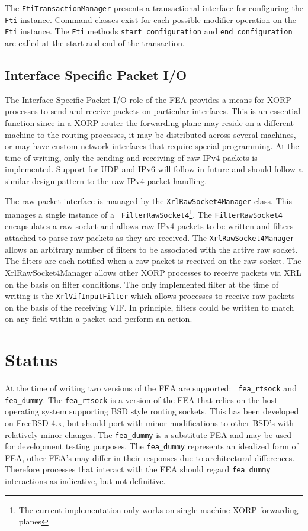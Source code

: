 \documentclass[11pt]{article}
\begin{document}
The {\tt FtiTransactionManager} presents a transactional interface for
configuring the {\tt Fti} instance.  Command classes exist for each
possible modifier operation on the {\tt Fti} instance.  The {\tt Fti}
methods {\tt start\_configuration} and {\tt end\_configuration} are
called at the start and end of the transaction.

\subsection{Interface Specific Packet I/O}

The Interface Specific Packet I/O role of the FEA provides a means for
XORP processes to send and receive packets on particular interfaces.
This is an essential function since in a XORP router the forwarding
plane may reside on a different machine to the routing processes, it
may be distributed across several machines, or may have custom network
interfaces that require special programming.  At the time of writing,
only the sending and receiving of raw IPv4 packets is implemented.
Support for UDP and IPv6 will follow in future and should follow a
similar design pattern to the raw IPv4 packet handling.

The raw packet interface is managed by the {\tt XrlRawSocket4Manager}
class.  This manages a single instance of a {\tt
FilterRawSocket4}\footnote{The current implementation only works on
single machine XORP forwarding planes}.  The {\tt FilterRawSocket4}
encapsulates a raw socket and allows raw IPv4 packets to be written
and filters attached to parse raw packets as they are received.  The
{\tt XrlRawSocket4Manager} allows an arbitrary number of filters to be
associated with the active raw socket.  The filters are each notified
when a raw packet is received on the raw socket.  The
XrlRawSocket4Manager allows other XORP processes to receive packets
via XRL on the basis on filter conditions.  The only implemented
filter at the time of writing is the {\tt XrlVifInputFilter} which
allows processes to receive raw packets on the basis of the receiving
VIF.  In principle, filters could be written to match on any field
within a packet and perform an action.

\section{Status}

At the time of writing two versions of the FEA are supported: {\tt
fea\_rtsock} and {\tt fea\_dummy}.  The {\tt fea\_rtsock} is a version
of the FEA that relies on the host operating system supporting BSD
style routing sockets.  This has been developed on FreeBSD 4.x, but
should port with minor modifications to other BSD's with relatively
minor changes.  The {\tt fea\_dummy} is a substitute FEA and may be
used for development testing purposes.  The {\tt fea\_dummy}
represents an idealized form of FEA, other FEA's may differ in their
responses due to architectural differences.  Therefore processes that
interact with the FEA should regard {\tt fea\_dummy} interactions as
indicative, but not definitive.
\end{document}
